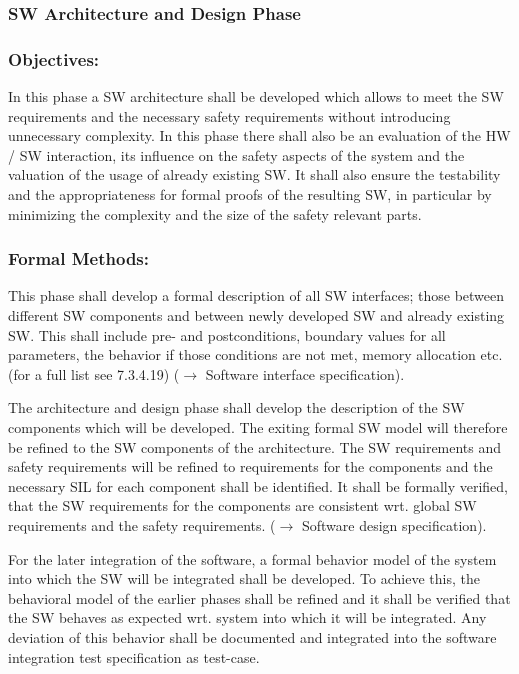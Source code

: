 \subsubsection{SW Architecture and Design Phase}
\label{sec:sw-arch-design}


\subsubsection{Objectives:}
\label{sec:sw-arch-objectives}
In this phase a SW architecture shall be developed which allows to meet the SW
requirements and the necessary safety requirements without introducing
unnecessary complexity. In this phase there shall also be an evaluation of the
HW / SW interaction, its influence on the safety aspects of the system and the
valuation of the usage of already existing SW. It shall also ensure the
testability and the appropriateness for formal proofs of the resulting SW, in
particular by minimizing the complexity and the size of the safety relevant
parts.

\subsubsection{Formal Methods:}
\label{sec:sw-arch-formal-methods}
This phase shall develop a formal description of all SW interfaces; those
between different SW components and between newly developed SW and already
existing SW. This shall include pre- and postconditions, boundary values for all
parameters, the behavior if those conditions are not met, memory allocation
etc. (for a full list see 7.3.4.19) ($\rightarrow$ Software interface
specification).

The architecture and design phase shall develop the description of the SW
components which will be developed. The exiting formal SW model will therefore
be refined to the SW components of the architecture. The SW requirements and
safety requirements will be refined to requirements for the components and the
necessary SIL for each component shall be identified. It shall be formally
verified, that the SW requirements for the components are consistent wrt. global
SW requirements and the safety requirements. ($\rightarrow$ Software design
specification).

For the later integration of the software, a formal behavior model of the system
into which the SW will be integrated shall be developed. To achieve this, the
behavioral model of the earlier phases shall be refined and it shall be verified
that the SW behaves as expected wrt. system into which it will be
integrated. Any deviation of this behavior shall be documented and integrated
into the software integration test specification as test-case.

